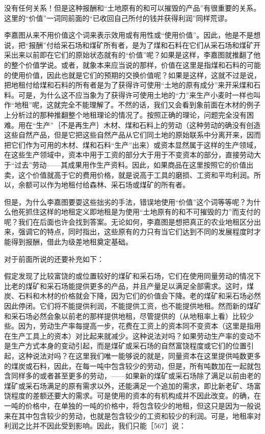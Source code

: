没有任何关系！但是这种报酬和“土地原有的和可以摧毁的产品”有很重要的关系。这里的“价值”一词同前面的“已收回自己所付的钱并获得利润”同样荒谬。

李嘉图从来不用价值这个词来表示效用或有用性或“使用价值”。因此，他是不是想说，把“报酬”付给采石场和煤矿所有者，是为了煤和石料在它们从采石场和煤矿开采出来以前即在它们的原始状态就有的“价值”呢？如果是这样，李嘉图就推翻了他的整个价值学说。或者，就象本来应当说的那样，价值在这里是指煤和石料的可能的使用价值，因此也就是它们的预期的交换价值呢？如果是这样，这就不过是说，把地租付给煤和石料的所有者是为了获得许可使用“土地的原有成分”来开采煤和石料。可是，为什么这不应当象为了获得许可使用土地的“力”来生产小麦时一样也叫作“地租”呢，这就完全不能理解了。不然的话，我们又会看到象前面在木材的例子上分析过的那种推翻整个地租理论的情况了。按照正确的理论，问题完全没有困难。用在“生产”｛不是再生产｝木材、煤和石料上的劳动（这种劳动的确没有创造这些自然产品，但是它把这些自然产品从它们同土地的原始联系中分离开来，因而把它们作为可用的木材、煤和石料“生产”出来）或资本显然属于这样的生产领域，在这些生产领域中，资本中用于工资的部分大于用于不变资本的部分，直接劳动大于“过去”劳动——其成果用作生产资料。因此，如果商品在这里按照它的价值出卖，这个价值就高于它的费用价格，就是说高于工具的磨损、工资和平均利润。所以，余额可以作为地租付给森林、采石场或煤矿的所有者。

但是，为什么李嘉图要耍这些拙劣的手法，错误地使用“价值”这个词等等呢？为什么他死抓住这样的地租定义即地租是为使用“土地原有的和不可摧毁的力”而支付的呢？我们在后面也许会找到答案。无论如何，李嘉图是想把真正的农业地租区分出来，强调它的特点，同时指出，这些原有的力只有当它们达到不同的发展程度时才能得到报酬，借此为级差地租奠定基础。



对于前面所说的还要补充如下：

假定发现了比较富饶的或位置较好的煤矿和采石场，它们在使用同量劳动的情况下比老的煤矿和采石场能提供更多的产品，并且产量足以满足全部需求。这时，煤炭、石料和木材的价格就会下降，因为它们的价值会下降。老的煤矿和采石场必然因此停闭。它们将不能提供利润，不能提供工资，也不能提供地租。然而新的煤矿和采石场必然会象以前老的那样提供地租，尽管提供的（从地租率上看）比较少些。因为，劳动生产率每提高一步，花费在工资上的资本同不变资本（这里是指用在生产工具上的资本）对比起来就减少。这种说法对吗？如果劳动生产率的变动不是生产方式本身的变动引起，而是煤矿或采石场的自然富饶程度或它们的位置引起，这种说法对吗？在这里我们唯一能够说的就是，同量资本在这里提供吨数更多的煤炭或石料，因此，在每一吨中包含较少的劳动，但是，所有吨数加在一起就包含同样多的或者甚至更多的劳动，——如果新的煤矿或采石场除了满足以前由老的煤矿或采石场满足的原有需求以外，还能满足一个追加的需求，即比新老矿、场富饶程度的差额还要大的需求。可是使用的资本的有机构成并不因此改变。的确，在一吨的价格中，在单独的一吨的价格中，将包含较少的地租，但这只是因为一般说来在其中包含较少的劳动，也就是包含较少的工资和较少的利润。可是，地租率对利润之比并不因此受到影响。因此，我们只能［567］说：


